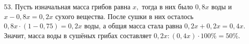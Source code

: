 53. Пусть изначальная масса грибов равна $x,$ тогда в них было $0,8x$ воды и $x-0,8x=0,2x$ сухого вещества. После сушки в них осталось $0,8x\cdot(1-0,75)=0,2x$ воды, а общая масса стала равна $0,2x+0,2x=0,4x.$ Значит, масса воды в сушёных грибах составляет $0,2x:(0,4x)\cdot100\%=50\%.$\\
